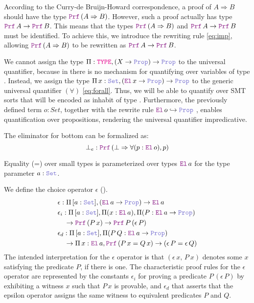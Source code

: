 According to the Curry-de Bruijn-Howard correspondence, a proof of $A \Rightarrow B$ should have the type $\prf\,(A \Rightarrow B)$.
However, such a proof actually has type $\prf\,A \ra \prf\,B$. This means that the types $\prf\,(A \Rightarrow B)$ and $\prf\,A \ra \prf\,B$ must be identiﬁed.
To achieve this, we introduce the rewriting rule \cref{eq:imp}, allowing $\prf\,(A \Rightarrow B)$ to be rewritten as $\prf\,A \ra \prf\,B$.

We cannot assign the type $\Pi : \type, (X \ra \prop) \ra \prop$ to the universal quantifier, because in \lpm{} there is no mechanism for quantifying over variables of type \type.
Instead, we assign the type $\Pi\,x:\set{},(\el\,x \ra \prop) \ra \prop$ to the generic universal quantiﬁer $(\forall)$ \cref{eq:forall}.
Thus, we will be able to quantify over SMT sorts that will be encoded as inhabit of type \set. Furthermore, the previously defined term $o: Set$, together with the rewrite rule $\el\,o\index{o}  \hookrightarrow \prop$
, enables quantification over propositions, rendering the universal quantifier impredicative.

\begin{example}
The eliminator for bottom can be formalized as:
\[ \bot_e : \prf\,(\bot \Rightarrow \forall (p: \el\,o), p) \]
\end{example}

Equality (=) over small types is parameterized over types $\el\,a$ for the type parameter $a : \set{}$.


\begin{definition} \label{def:eps}
We define the choice operator $\epsilon$ (\cite[\S 2.1]{alethespec}).
\begin{align}
& \epsilon: \Pi\, {[a: \set]}, (\el\,a \ra \prop) \ra \el\,a \\
& \epsilon_i: \Pi\, {[a: \set]}, \Pi (x : \el\,a), \Pi (P : \el\,a \ra \prop) \\
& \quad \ra \prf\,(P\,x) \ra \prf\, P\,(\epsilon\,P) \\
& \epsilon_{d}: \Pi\, {[a: \set]}, \Pi (P\,Q : \el\,a \ra \prop) \\
& \quad \ra \Pi\, x : \el\,a, \prf\,(P\,x = Q\,x) \ra (\epsilon \, P = \epsilon \, Q)
\end{align}
The intended interpretation for the $\epsilon$ operator is that $(\epsilon\,x,\, P~x)$ denotes some $x$ satisfying the predicate $P$, if there is one.
The characteristic proof rules for the $\epsilon$ operator are represented by the constants $\epsilon_i$ for proving a predicate $P\,(\epsilon\,P)$ by exhibiting a witness $x$ such that $P\,x$ is provable,
and $\epsilon_d$ that asserts that the epsilon operator assigns the same witness to equivalent predicates $P$ and $Q$.
\end{definition}

